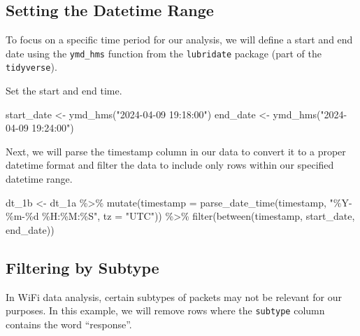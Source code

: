 \documentclass[
  letterpaper,
]{scrbook}
\newenvironment{Shaded}{\begin{snugshade}}{\end{snugshade}}
\newcommand{\AttributeTok}[1]{\textcolor[rgb]{0.40,0.45,0.13}{#1}}
\newcommand{\FunctionTok}[1]{\textcolor[rgb]{0.28,0.35,0.67}{#1}}
\newcommand{\NormalTok}[1]{\textcolor[rgb]{0.00,0.23,0.31}{#1}}
\newcommand{\OtherTok}[1]{\textcolor[rgb]{0.00,0.23,0.31}{#1}}
\newcommand{\SpecialCharTok}[1]{\textcolor[rgb]{0.37,0.37,0.37}{#1}}
\newcommand{\StringTok}[1]{\textcolor[rgb]{0.13,0.47,0.30}{#1}}
\begin{document}
\hypertarget{setting-the-datetime-range}{%
\subsection{Setting the Datetime
Range}\label{setting-the-datetime-range}}

To focus on a specific time period for our analysis, we will define a
start and end date using the \texttt{ymd\_hms} function from the
\texttt{lubridate} package (part of the \texttt{tidyverse}).

Set the start and end time.

\begin{Shaded}
\begin{Highlighting}[]
\NormalTok{start\_date }\OtherTok{\textless{}{-}} \FunctionTok{ymd\_hms}\NormalTok{(}\StringTok{"2024{-}04{-}09 19:18:00"}\NormalTok{)}
\NormalTok{end\_date }\OtherTok{\textless{}{-}} \FunctionTok{ymd\_hms}\NormalTok{(}\StringTok{"2024{-}04{-}09 19:24:00"}\NormalTok{)}
\end{Highlighting}
\end{Shaded}

Next, we will parse the timestamp column in our data to convert it to a
proper datetime format and filter the data to include only rows within
our specified datetime range.

\begin{Shaded}
\begin{Highlighting}[]
\NormalTok{dt\_1b }\OtherTok{\textless{}{-}}\NormalTok{ dt\_1a }\SpecialCharTok{\%\textgreater{}\%}
  \FunctionTok{mutate}\NormalTok{(}\AttributeTok{timestamp =} \FunctionTok{parse\_date\_time}\NormalTok{(timestamp, }\StringTok{"\%Y{-}\%m{-}\%d \%H:\%M:\%S"}\NormalTok{, }\AttributeTok{tz =} \StringTok{"UTC"}\NormalTok{)) }\SpecialCharTok{\%\textgreater{}\%} \FunctionTok{filter}\NormalTok{(}\FunctionTok{between}\NormalTok{(timestamp, start\_date, end\_date))}
\end{Highlighting}
\end{Shaded}

\hypertarget{filtering-by-subtype}{%
\subsection{Filtering by Subtype}\label{filtering-by-subtype}}

In WiFi data analysis, certain subtypes of packets may not be relevant
for our purposes. In this example, we will remove rows where the
\texttt{subtype} column contains the word ``response''.
\end{document}
